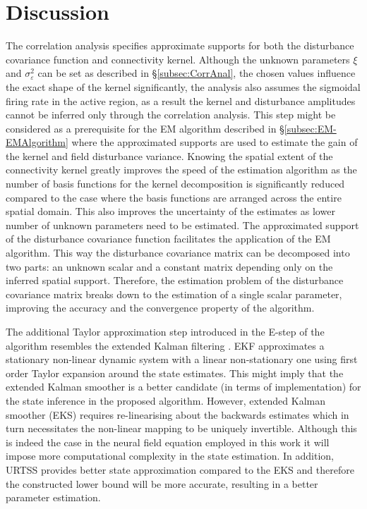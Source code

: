 \documentclass[]{article}
\begin{document}
\section{Discussion}\label{sec:EM-Discussion}
The correlation analysis specifies approximate supports for both the disturbance covariance function and connectivity kernel. Although the unknown parameters $\xi$ and $\sigma_{\varepsilon}^2$ can be set as described in \S\ref{subsec:CorrAnal}, the chosen values influence the exact shape of the kernel significantly, the analysis also assumes the sigmoidal firing rate in the active region, as a result  the kernel and disturbance amplitudes cannot be inferred only through the correlation analysis. This step might be considered as a prerequisite for the EM algorithm described in \S\ref{subsec:EM-EMAlgorithm} where the approximated supports are used to estimate the gain of the kernel and field disturbance variance. Knowing the spatial extent of the connectivity kernel greatly improves the speed of the estimation algorithm as the number of basis functions for the kernel decomposition is significantly reduced  compared to the case where the basis functions are arranged across the entire spatial domain. This also improves the uncertainty of the estimates as lower number of unknown parameters need to be estimated. The approximated support of the disturbance covariance function facilitates the application of the EM algorithm. This way the disturbance covariance matrix can be decomposed into two parts: an unknown scalar and a constant matrix depending only on the inferred spatial support. Therefore, the estimation problem of the disturbance covariance matrix breaks down to the estimation of a single scalar parameter, improving the accuracy and the convergence property of the algorithm.

The additional Taylor approximation step introduced in the E-step of the algorithm resembles the extended Kalman filtering \cite{Jazwinski1970,Chui2009}. EKF approximates a stationary non-linear dynamic system with a linear non-stationary one using first order Taylor expansion around the state estimates. This might imply that the extended Kalman smoother is a better candidate (in terms of implementation) for the state inference in the proposed algorithm. However, extended Kalman smoother (EKS) requires re-linearising about the backwards estimates which in turn necessitates the non-linear mapping to be uniquely invertible. Although this is indeed the case in the neural field equation employed in this work it will impose more computational complexity in the state estimation. In addition, URTSS provides better state approximation compared to the EKS \cite{Haykin2001} and therefore the constructed lower bound will be more accurate, resulting in a better parameter estimation.
\end{document}
